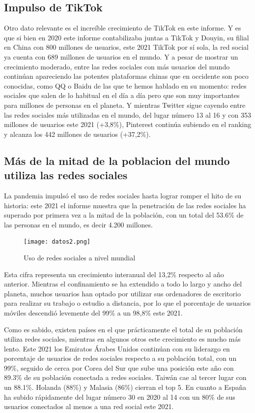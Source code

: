 \subsection{Impulso de TikTok}

Otro dato relevante es el increíble crecimiento de TikTok en este informe. Y es que si bien en 2020 este informe contabilizaba juntas a TikTok y Douyin, su filial en China con 800 millones de usuarios, este 2021 TikTok por sí sola, la red social ya cuenta con 689 millones de usuarios en el mundo. Y a pesar de mostrar un crecimiento moderado, entre las redes sociales con más usuarios del mundo continúan apareciendo las potentes plataformas chinas que en occidente son poco conocidas, como QQ o Baidu de las que te hemos hablado en su momento: redes sociales que salen de lo habitual en el día a día pero que son muy importantes para millones de personas en el planeta. Y mientras Twitter sigue cayendo entre las redes sociales más utilizadas en el mundo, del lugar número 13 al 16 y con 353 millones de usuarios este 2021 (+3,8\%), Pinterest continúa subiendo en el ranking y alcanza los 442 millones de usuarios (+37,2\%).

\subsection{Más de la mitad de la poblacion del mundo utiliza las redes sociales}

La pandemia impulsó el uso de redes sociales hasta lograr romper el hito de su historia: este 2021 el informe muestra que la penetración de las redes sociales ha superado por primera vez a la mitad de la población, con un total del 53.6\% de las personas en el mundo, es decir 4.200 millones.

\begin{figure}[ht!]
    \texttt{[image: datos2.png]}
    \caption{Uso de redes sociales a nivel mundial}
    \label{datos2}
\end{figure}

Esta cifra representa un crecimiento interanual del 13,2\% respecto al año anterior. Mientras el confinamiento se ha extendido a todo lo largo y ancho del planeta, muchos usuarios han optado por utilizar sus ordenadores de escritorio para realizar su trabajo o estudio a distancia, por lo que el porcentaje de usuarios móviles descendió levemente del 99\% a un 98,8\% este 2021.

Como es sabido, existen países en el que prácticamente el total de su población utiliza redes sociales, mientras en algunos otros este crecimiento es mucho más lento. Este 2021 los Emiratos Árabes Unidos continúan con su liderazgo en porcentaje de usuarios de redes sociales respecto a su población total, con un 99\%, seguido de cerca por Corea del Sur que sube una posición este año con 89.3\% de su población conectada a redes sociales. Taiwán cae al tercer lugar con un 88.1\%. Holanda (88\%) y Malasia (86\%) cierran el top 5. En cuanto a España ha subido rápidamente del lugar número 30 en 2020 al 14 con un 80\% de sus usuarios conectados al menos a una red social este 2021.

